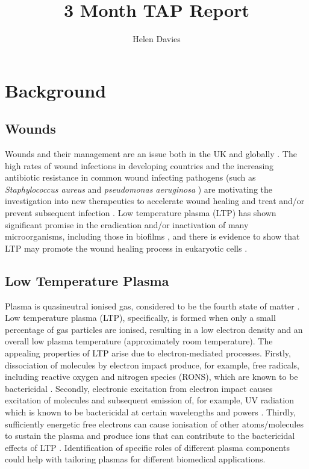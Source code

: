 \documentclass[11pt, oneside]{article}   	%
\title{3 Month TAP Report}
\author{Helen Davies}
\date{}							%
\begin{document}
\maketitle

\section{Background}

\subsection{Wounds}

Wounds and their management are an issue both in the UK and globally \cite{Posnett2008burden}.
The high rates of wound infections in developing countries and the increasing antibiotic resistance in common wound infecting pathogens (such as \textit{Staphylococcus aureus} and \textit{pseudomonas aeruginosa} \cite{Church2006burn, Bowler2001wound}) are motivating the investigation into new therapeutics to accelerate wound healing and treat and/or prevent subsequent infection \cite{Kihla2014risk, Chambers2009waves, Godebo2013multidrug, Howell2005a}.
Low temperature plasma (LTP) has shown significant promise in the eradication and/or inactivation of many microorganisms, including those in biofilms \cite{Laroussi2005low}, and there is evidence to show that LTP may promote the wound healing process in eukaryotic cells \cite{Haertel2014nonthermal, Kramer2013suitability, Isbary2012successful, Isbary2010a}.


\subsection{Low Temperature Plasma}

Plasma is quasineutral ionised gas, considered to be the fourth state of matter \cite{Fridman2013plasmamedicine}.
Low temperature plasma (LTP), specifically, is formed when only a small percentage of gas particles are ionised, resulting in a low electron density and an overall low plasma temperature (approximately room temperature).
The appealing properties of LTP arise due to electron-mediated processes.
Firstly, dissociation of molecules by electron impact produce, for example, free radicals, including reactive oxygen and nitrogen species (RONS), which are known to be bactericidal \cite{Kong2009plasma}.
Secondly, electronic excitation from electron impact causes excitation of molecules and subsequent emission of, for example, UV radiation which is known to be bactericidal at certain wavelengths and powers \cite{Laroussi2004evaluation}.
Thirdly, sufficiently energetic free electrons can cause ionisation of other atoms/molecules to sustain the plasma and produce ions that can contribute to the bactericidal effects of LTP \cite{Mendis2000a, Laroussi2002nonthermal}.
Identification of specific roles of different plasma components could help with tailoring plasmas for different biomedical applications.
\end{document}
